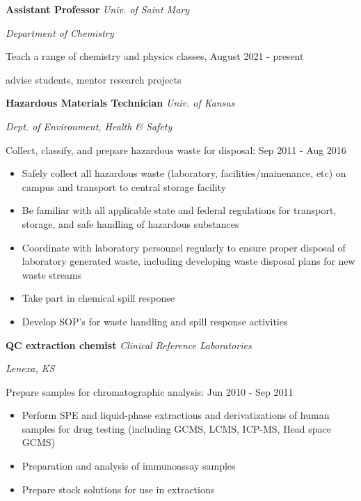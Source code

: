 {\bf Assistant Professor} \hfill \textit{Univ. of Saint Mary}

\hfill \textit{Department of Chemistry}

Teach a range of chemistry and physics classes,  \hfill August 2021 - present

advise students, mentor research projects

\vspace{\y}
{\bf Hazardous Materials Technician} \hfill \textit{Univ. of Kansas}

\hfill \textit{Dept. of Environment, Health \& Safety}

Collect, classify, and prepare hazardous waste for disposal: \hfill Sep 2011 - Aug 2016
\begin{itemize}[rightmargin=\dimexpr\linewidth-8cm-\leftmargin\relax,noitemsep,topsep=0cm]
\raggedright
  \item Safely collect all hazardous waste (laboratory, facilities/mainenance, etc) on campus and transport to central storage facility
  \item Be familiar with all applicable state and federal regulations for transport, storage, and safe handling of hazardous substances
  \item Coordinate with laboratory personnel regularly to ensure proper disposal of laboratory generated waste, including developing waste disposal plans for new waste streams
  \item Take part in chemical spill response
  \item Develop SOP's for waste handling and spill response activities
\end{itemize}

\vspace{\y}
{\bf QC extraction chemist} \hfill \textit{Clinical Reference Laboratories}

\hfill \textit{Lenexa, KS}

Prepare samples for chromatographic analysis: \hfill Jun 2010 - Sep 2011
\begin{itemize}[rightmargin=\dimexpr\linewidth-8cm-\leftmargin\relax,noitemsep,topsep=0cm]
\raggedright
  \item Perform SPE and liquid-phase extractions and derivatizations of human samples for drug testing (including GCMS, LCMS, ICP-MS, Head space GCMS)
  \item Preparation and analysis of immunoassay samples
  \item Prepare stock solutions for use in extractions
\end{itemize}
